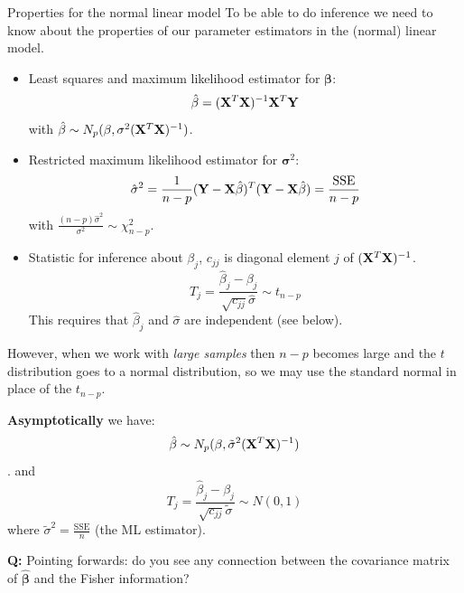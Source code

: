 \documentclass[
  ignorenonframetext,
]{beamer}
\begin{document}
\begin{frame}{Properties for the normal linear model}
\label{properties-for-the-normal-linear-model}
To be able to do inference we need to know about the properties of our
parameter estimators in the (normal) linear model.

\begin{itemize}
\item
  Least squares and maximum likelihood estimator for
  \({\boldsymbol \beta}\):
  \[ \hat{\beta}=({\bf X}^T{\bf X})^{-1} {\bf X}^T {\bf Y}\] with
  \(\hat{\beta}\sim N_{p}(\beta,\sigma^2({\bf X}^T{\bf X})^{-1})\).
\item
  Restricted maximum likelihood estimator for
  \({\boldsymbol \sigma}^2\):
  \[ \hat{\sigma}^2=\frac{1}{n-p}({\bf Y}-{\bf X}\hat{\beta})^T({\bf Y}-{\bf X}\hat{\beta})=\frac{\text{SSE}}{n-p}\]
  with \(\frac{(n-p)\hat{\sigma}^2}{\sigma^2} \sim \chi^2_{n-p}\).
\item
  Statistic for inference about \(\beta_j\), \(c_{jj}\) is diagonal
  element \(j\) of \(({\bf X}^T{\bf X})^{-1}\).
  \[ T_j=\frac{\hat{\beta}_j-\beta_j}{\sqrt{c_{jj}}\hat{\sigma}}\sim t_{n-p}\]
  This requires that \(\hat{\beta}_j\) and \(\hat{\sigma}\) are
  independent (see below).
\end{itemize}
\end{frame}

\begin{frame}
However, when we work with \emph{large samples} then \(n-p\) becomes
large and the \(t\) distribution goes to a normal distribution, so we
may use the standard normal in place of the \(t_{n-p}\).

\textbf{Asymptotically} we have:
\[\hat{\beta}\sim N_{p}(\beta,\tilde{\sigma}^2({\bf X}^T{\bf X})^{-1})\].
and
\[ T_j=\frac{\hat{\beta}_j-\beta_j}{\sqrt{c_{jj}}\tilde{\sigma}}\sim N(0,1)\]
where \(\tilde{\sigma}^2=\frac{\text{SSE}}{n}\) (the ML estimator).

\textbf{Q:} Pointing forwards: do you see any connection between the
covariance matrix of \(\hat{\boldsymbol{\beta}}\) and the Fisher
information?
\end{frame}
\end{document}
